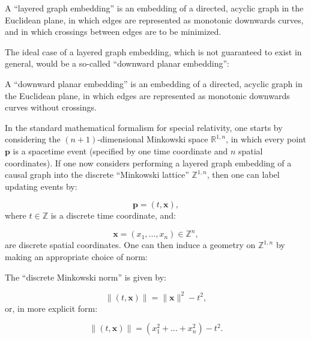 \documentclass{article}
\begin{document}
\begin{definition}
A ``layered graph embedding'' is an embedding of a directed, acyclic graph in the Euclidean plane, in which edges are represented as monotonic downwards curves, and in which crossings between edges are to be minimized.
\end{definition}
The ideal case of a layered graph embedding, which is not guaranteed to exist in general, would be a so-called ``downward planar embedding'':

\begin{definition}
A ``downward planar embedding'' is an embedding of a directed, acyclic graph in the Euclidean plane, in which edges are represented as monotonic downwards curves without crossings.
\end{definition}

In the standard mathematical formalism for special relativity\cite{naber}, one starts by considering the ${(n + 1)}$-dimensional Minkowski space ${\mathbb{R}^{1, n}}$, in which every point ${\mathbf{p}}$ is a spacetime event (specified by one time coordinate and $n$ spatial coordinates). If one now considers performing a layered graph embedding of a causal graph into the discrete ``Minkowski lattice'' ${\mathbb{Z}^{1, n}}$, then one can label updating events by:

\begin{equation}
\mathbf{p} = \left( t, \mathbf{x} \right),
\end{equation}
where ${t \in \mathbb{Z}}$ is a discrete time coordinate, and:

\begin{equation}
\mathbf{x} = \left( x_1, \dots, x_n \right) \in \mathbb{Z}^n,
\end{equation}
are discrete spatial coordinates. One can then induce a geometry on ${\mathbb{Z}^{1, n}}$ by making an appropriate choice of norm:

\begin{definition}
The ``discrete Minkowski norm'' is given by:

\begin{equation}
\lVert \left( t, \mathbf{x} \right) \rVert = \lVert \mathbf{x} \rVert^2 - t^2,
\end{equation}
or, in more explicit form:

\begin{equation}
\lVert \left( t, \mathbf{x} \right) \rVert = \left( x_{1}^{2} + \dots + x_{n}^{2} \right) - t^2.
\end{equation}
\end{definition}
\end{document}
